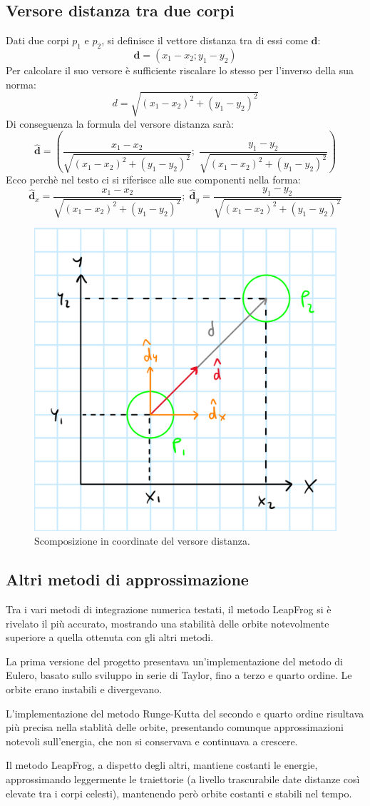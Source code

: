 \documentclass{article}
\begin{document}
\subsection{Versore distanza tra due corpi}
\label{ap1}
Dati due corpi $p_{1}$ e $p_{2}$, si definisce il vettore distanza tra di essi come $\textbf{d}$:
\begin{equation}
    \textbf{d}=(x_{1}-x_{2}; y_{1}-y_{2})
\end{equation}
Per calcolare il suo versore è sufficiente riscalare lo stesso per l'inverso della sua norma:
\begin{equation}
    d=\sqrt{(x_{1}-x_{2})^2+(y_{1}-y_{2})^2}
\end{equation}
Di conseguenza la formula del versore distanza sarà:
\begin{equation}
    \mathbf{\hat{d}}=(\frac{x_{1}-x_{2}}{\sqrt{(x_{1}-x_{2})^2+(y_{1}-y_{2})^2}}; \; \frac{y_{1}-y_{2}}{\sqrt{(x_{1}-x_{2})^2+(y_{1}-y_{2})^2}})   
\end{equation}
Ecco perchè nel testo ci si riferisce alle sue componenti nella forma:
\begin{equation}
    \mathbf{\hat{d}}_{x}=\frac{x_{1}-x_{2}}{\sqrt{(x_{1}-x_{2})^2+(y_{1}-y_{2})^2}} ;\; \mathbf{\hat{d}}_{y}=\frac{y_{1}-y_{2}}{\sqrt{(x_{1}-x_{2})^2+(y_{1}-y_{2})^2}}
\end{equation}

\begin{figure} [H]
    \centering
    \includegraphics[height=.20\linewidth]{VersoreDistanza.png}
    \caption{Scomposizione in coordinate del versore distanza.}
\end{figure}


\subsection{Altri metodi di approssimazione}
\label{ap2}
Tra i vari metodi di integrazione numerica testati, il metodo LeapFrog si è rivelato il più accurato, mostrando una stabilità delle orbite notevolmente superiore a quella ottenuta con gli altri metodi.

La prima versione del progetto presentava un'implementazione del metodo di Eulero, basato sullo sviluppo in serie di Taylor, fino a terzo e quarto ordine. Le orbite erano instabili e divergevano.

L'implementazione del metodo Runge-Kutta del secondo e quarto ordine risultava più precisa nella stablità delle orbite, presentando comunque approssimazioni notevoli sull'energia, che non si conservava e continuava a crescere.

Il metodo LeapFrog, a dispetto degli altri, mantiene costanti le energie, approssimando leggermente le traiettorie (a livello trascurabile date distanze così elevate tra i corpi celesti), mantenendo però orbite costanti e stabili nel tempo.
\end{document}

